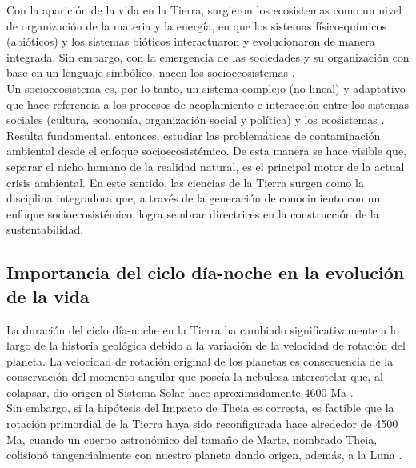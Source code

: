 Con la aparición de la vida en la Tierra, surgieron los ecosistemas como un nivel de organización de la materia y la energía, en que los sistemas físico-químicos (abióticos) y los sistemas bióticos interactuaron y evolucionaron de manera integrada. Sin embargo, con la emergencia de las sociedades y su organización con base en un lenguaje simbólico, nacen los socioecosistemas \citep{Avila2019,Uribe2014,Urquiza2015}.\\

Un socioecosistema es, por lo tanto, un sistema complejo (no lineal) y adaptativo que hace referencia a los procesos de acoplamiento e interacción entre los sistemas sociales (cultura, economía, organización social y política) y los ecosistemas \citep{Urquiza2015}.\\

Resulta fundamental, entonces, estudiar las problemáticas de contaminación ambiental desde el enfoque socioecosistémico. De esta manera se hace visible que, separar el nicho humano de la realidad natural, es el principal motor de la actual crisis ambiental. En este sentido, las ciencias de la Tierra surgen como la disciplina integradora que, a través de la generación de conocimiento con un enfoque socioecosistémico, logra sembrar directrices en la construcción de la sustentabilidad.\\

\subsection{Importancia del ciclo día-noche en la evolución de la vida}

La duración del ciclo día-noche en la Tierra ha cambiado significativamente a lo largo de la historia geológica debido a la variación de la velocidad de rotación del planeta. La velocidad de rotación original de los planetas  es consecuencia de la conservación del momento angular que poseía la nebulosa interestelar que, al colapsar, dio origen al Sistema Solar hace aproximadamente 4600 Ma \citep{Greaves2005}.\\

Sin embargo, si la hipótesis del Impacto de Theia es correcta, es factible que la rotación primordial de la Tierra haya sido reconfigurada hace alrededor de 4500 Ma, cuando un cuerpo astronómico del tamaño de Marte, nombrado Theia, colisionó tangencialmente con nuestro planeta dando origen, además, a la Luna \citep{Stevenson1987}.\\

